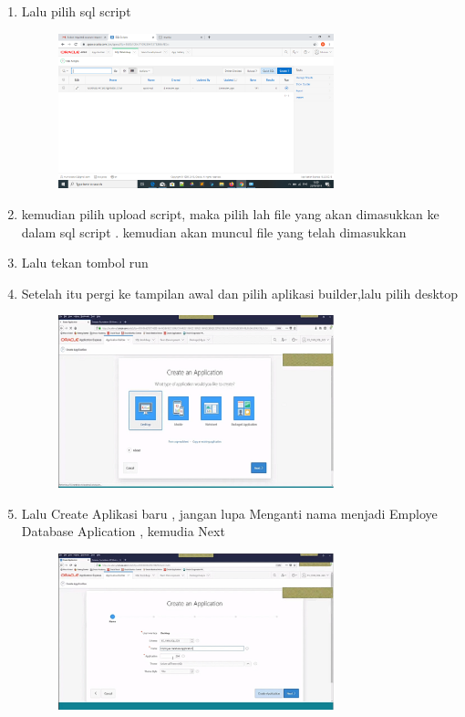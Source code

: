 \documentclass{article}
\begin{document}
\begin{enumerate}
\newpage\item  Lalu pilih sql script
\begin{figure}[h]
\centerline{\includegraphics[width=8cm]{figure/E.png}}
            \end{figure}
 
\item  kemudian pilih upload script, maka pilih lah file yang akan dimasukkan ke dalam sql script . kemudian akan muncul file yang telah dimasukkan
\item  Lalu tekan tombol run
\item  Setelah itu pergi ke tampilan awal dan pilih aplikasi builder,lalu pilih desktop
\begin{figure}[h]
\centerline{\includegraphics[width=8cm]{figure/F.png}}
            \end{figure}
 
\newpage\item  Lalu  Create Aplikasi baru , jangan lupa Menganti nama menjadi Employe Database Aplication , kemudia Next
\begin{figure}[h]
\centerline{\includegraphics[width=8cm]{figure/G.png}}
            \end{figure}


\end{enumerate}
\end{document}
